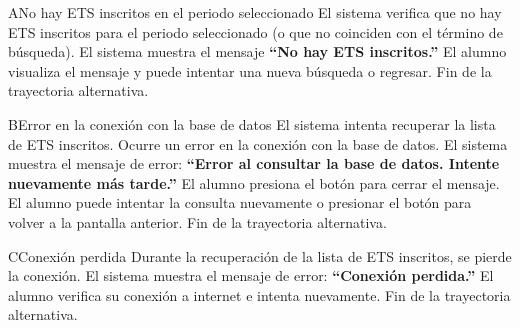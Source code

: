\begin{UCtrayectoriaA}{A}{No hay ETS inscritos en el periodo seleccionado}
	\UCpaso El sistema verifica que no hay ETS inscritos para el periodo seleccionado (o que no coinciden con el término de búsqueda).
	\UCpaso El sistema muestra el mensaje \textbf{ ``No hay ETS inscritos.''}
	\UCpaso[\UCactor] El alumno visualiza el mensaje y puede intentar una nueva búsqueda o regresar.
	\UCpaso Fin de la trayectoria alternativa.
\end{UCtrayectoriaA}

\begin{UCtrayectoriaA}{B}{Error en la conexión con la base de datos}
	\UCpaso El sistema intenta recuperar la lista de ETS inscritos.
	\UCpaso Ocurre un error en la conexión con la base de datos.
	\UCpaso El sistema muestra el mensaje de error: \textbf{ ``Error al consultar la base de datos. Intente nuevamente más tarde.''}
	\UCpaso[\UCactor] El alumno presiona el botón  para cerrar el mensaje.
	\UCpaso[\UCactor] El alumno puede intentar la consulta nuevamente o presionar el botón  para volver a la pantalla anterior.
	\UCpaso Fin de la trayectoria alternativa.
\end{UCtrayectoriaA}

\begin{UCtrayectoriaA}{C}{Conexión perdida}
	\UCpaso Durante la recuperación de la lista de ETS inscritos, se pierde la conexión.
	\UCpaso El sistema muestra el mensaje de error: \textbf{ ``Conexión perdida.''}
	\UCpaso[\UCactor] El alumno verifica su conexión a internet e intenta nuevamente.
	\UCpaso Fin de la trayectoria alternativa.
\end{UCtrayectoriaA}

